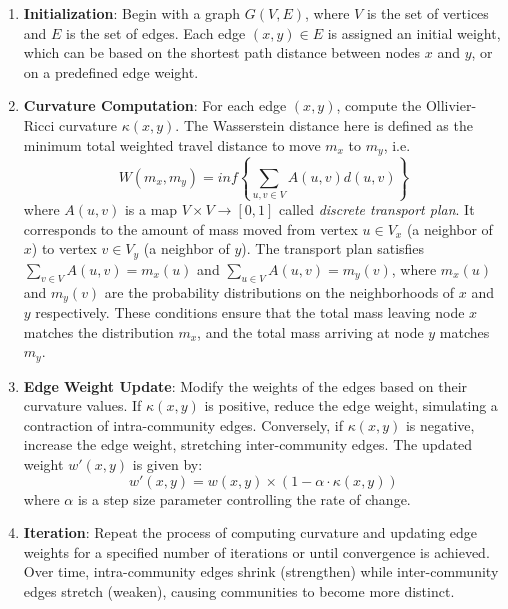 \documentclass[12pt,a4paper]{article}
\begin{document}
\begin{enumerate}
    \item \textbf{Initialization}: Begin with a graph $G(V, E)$, where $V$ is the set of vertices and $E$ is the set of edges. Each edge $(x, y) \in E$ is assigned an initial weight, which can be based on the shortest path distance between nodes $x$ and $y$, or on a predefined edge weight.
    
    \item \textbf{Curvature Computation}: For each edge $(x, y)$, compute the Ollivier-Ricci curvature $\kappa(x, y)$. The Wasserstein distance here is defined as the minimum total weighted travel distance to move $m_x$ to $m_y$, i.e.
    \begin{equation}
        W(m_x,m_y) =  \textit{inf} \left\{ \sum\limits_{u,v\in V} A(u,v) d(u,v)  \right\}
    \end{equation}
    where $A(u,v)$ is a map $V\times V \rightarrow [0,1]$ called \textit{discrete transport plan}. It corresponds to the amount of mass moved from vertex $u \in V_x$ (a neighbor of $x$) to vertex $v \in V_y$ (a neighbor of $y$). The transport plan satisfies $\sum_{v \in V} A(u,v) = m_x(u)$ and $\sum_{u \in V} A(u, v) = m_y(v)$, where $m_x (u)$ and $m_y(v)$ are the probability distributions on the neighborhoods of $x$ and $y$ respectively. These conditions ensure that the total mass leaving node $x$ matches the distribution $m_x$, and the total mass arriving at node $y$ matches $m_y$.
    \item \textbf{Edge Weight Update}: Modify the weights of the edges based on their curvature values. If $\kappa(x, y)$ is positive, reduce the edge weight, simulating a contraction of intra-community edges. Conversely, if $\kappa(x, y)$ is negative, increase the edge weight, stretching inter-community edges. The updated weight $w'(x, y)$ is given by:
    \begin{equation}\label{eq4}
    w'(x, y) = w(x, y) \times (1 - \alpha \cdot \kappa(x, y))
    \end{equation}
    where $\alpha$ is a step size parameter controlling the rate of change.
    
    \item \textbf{Iteration}: Repeat the process of computing curvature and updating edge weights for a specified number of iterations or until convergence is achieved. Over time, intra-community edges shrink (strengthen) while inter-community edges stretch (weaken), causing communities to become more distinct.


\end{enumerate}
\end{document}
